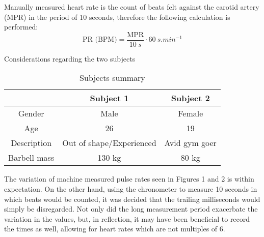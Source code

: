 Manually measured heart rate is the count of beats felt against the carotid artery (MPR) in the period of 10 seconds, therefore the following calculation is performed:
\begin{equation}
    \text{PR (BPM)} = \frac{\text{MPR}}{\SI{10}{s}} \cdot \SI{60}{s.min^{-1}}
\end{equation}

Considerations regarding the two subjects

\begin{table} [h]
    \centering
    \begin{tabular} {ccc}
        & Subject 1 & Subject 2 \\ \hline
        Gender & Male & Female \\
        Age & 26 & 19\\
        Description & Out of shape/Experienced & Avid gym goer\\
        Barbell mass & 130 kg & 80 kg\\
        \hline
    \end{tabular}
    \caption{Subjects summary}
\end{table}
The variation of machine measured pulse rates seen in Figures 1 and 2 is within expectation.
On the other hand, using the chronometer to measure 10 seconds in which beats would be counted, it was decided that the trailing milliseconds would simply be disregarded.
Not only did the long measurement period exacerbate the variation in the values, but, in reflection, it may have been beneficial to record the times as well, allowing for heart rates which are not multiples of 6. 
